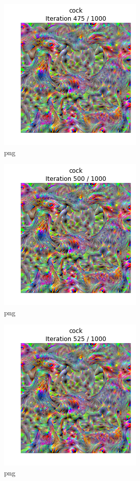 \documentclass[]{book}
\theoremstyle{definition}
\theoremstyle{definition}
\theoremstyle{definition}
\theoremstyle{remark}
\begin{document}
\begin{figure}
\centering
\includegraphics{Network-Visualization-TensorFlow_files/Network-Visualization-TensorFlow_22_19.png}
\caption{png}
\end{figure}

\begin{figure}
\centering
\includegraphics{Network-Visualization-TensorFlow_files/Network-Visualization-TensorFlow_22_20.png}
\caption{png}
\end{figure}

\begin{figure}
\centering
\includegraphics{Network-Visualization-TensorFlow_files/Network-Visualization-TensorFlow_22_21.png}
\caption{png}
\end{figure}
\end{document}
